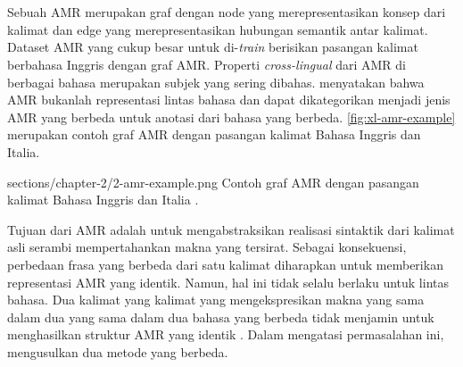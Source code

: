 \section{}

Sebuah \gls{AMR} merupakan graf dengan node yang merepresentasikan konsep dari kalimat dan edge yang merepresentasikan hubungan semantik antar kalimat.
Dataset \gls{AMR} yang cukup besar untuk di-\textit{train} berisikan pasangan kalimat berbahasa Inggris dengan graf \gls{AMR}.
Properti \textit{cross-lingual} dari \gls{AMR} di berbagai bahasa merupakan subjek yang sering dibahas.
\textcite{banarescu2013} menyatakan bahwa \gls{AMR} bukanlah representasi lintas bahasa dan dapat dikategorikan menjadi jenis \gls{AMR} yang berbeda untuk anotasi dari bahasa yang berbeda.
\cref{fig:xl-amr-example} merupakan contoh graf \gls{AMR} dengan pasangan kalimat Bahasa Inggris dan Italia.

  {sections/chapter-2/2-amr-example.png}
  {Contoh graf \gls{AMR} dengan pasangan kalimat Bahasa Inggris dan Italia .}

Tujuan dari \gls{AMR} adalah untuk mengabstraksikan realisasi sintaktik dari kalimat asli serambi mempertahankan makna yang tersirat.
Sebagai konsekuensi, perbedaan frasa yang berbeda dari satu kalimat diharapkan untuk memberikan representasi \gls{AMR} yang identik.
Namun, hal ini tidak selalu berlaku untuk lintas bahasa.
Dua kalimat yang kalimat yang mengekspresikan makna yang sama dalam dua yang sama dalam dua bahasa yang berbeda tidak menjamin untuk menghasilkan struktur \gls{AMR} yang identik .
Dalam mengatasi permasalahan ini, \textcite{damonte2018} mengusulkan dua metode yang berbeda.


